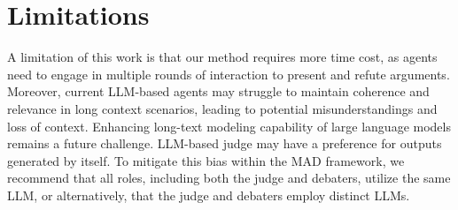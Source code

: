 \section*{Limitations}

A limitation of this work is that our method requires more time cost, as agents need to engage in multiple rounds of interaction to present and refute arguments. 
Moreover, current LLM-based agents may struggle to maintain coherence and relevance in long context scenarios, leading to potential misunderstandings and loss of context.
Enhancing long-text modeling capability of large language models remains a future challenge.
LLM-based judge may have a preference for outputs generated by itself. To mitigate this bias within the MAD framework, we recommend that all roles, including both the judge and debaters, utilize the same LLM, or alternatively, that the judge and debaters employ distinct LLMs.

